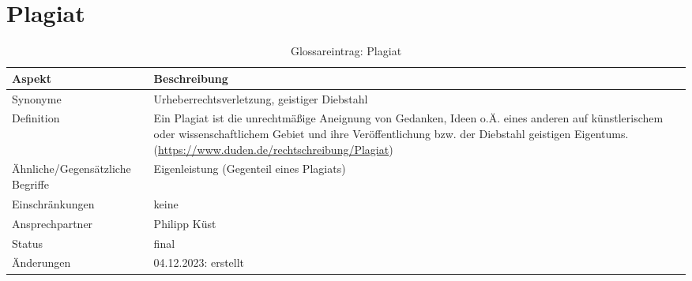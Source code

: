 \section*{Plagiat}\label{sec:glossar_plagiat}
\begin{table}[H]
    \label{tab:glossar_plagiat}
    \begin{tabularx}{\textwidth}{|l|X|}
        \hline
        \textbf{Aspekt}                  & \textbf{Beschreibung}                        \\
        \hline
        Synonyme                         & Urheberrechtsverletzung, geistiger Diebstahl \\
        \hline
        Definition & Ein Plagiat ist die unrechtmäßige Aneignung von Gedanken, Ideen o.Ä. eines anderen auf künstlerischem oder wissenschaftlichem Gebiet und ihre Veröffentlichung bzw. der Diebstahl geistigen Eigentums.
        (\url{https://www.duden.de/rechtschreibung/Plagiat}) \\
        \hline
        Ähnliche/Gegensätzliche Begriffe & Eigenleistung (Gegenteil eines Plagiats)     \\
        \hline
        Einschränkungen                  & keine                                        \\
        \hline
        Ansprechpartner                  & Philipp Küst                                 \\
        \hline
        Status                           & final                                        \\
        \hline
        Änderungen                       & 04.12.2023: erstellt                         \\
        \hline
    \end{tabularx}
    \caption{Glossareintrag: Plagiat}
\end{table}


